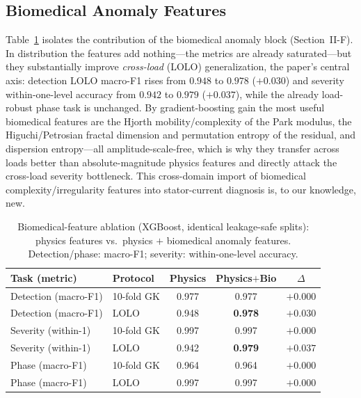 \documentclass[journal]{IEEEtran}
\begin{document}
\subsection{Biomedical Anomaly Features}
Table~\ref{tab:bioablate} isolates the contribution of the biomedical anomaly block (Section~II-F). In
distribution the features add nothing---the metrics are already saturated---but they substantially
improve \emph{cross-load} (LOLO) generalization, the paper's central axis: detection LOLO macro-F1 rises
from $0.948$ to $0.978$ ($+0.030$) and severity within-one-level accuracy from $0.942$ to $0.979$
($+0.037$), while the already load-robust phase task is unchanged. By gradient-boosting gain the most
useful biomedical features are the Hjorth mobility/complexity of the Park modulus, the
Higuchi/Petrosian fractal dimension and permutation entropy of the residual, and dispersion entropy---all
amplitude-scale-free, which is why they transfer across loads better than absolute-magnitude physics
features and directly attack the cross-load severity bottleneck. This cross-domain import of biomedical
complexity/irregularity features into stator-current diagnosis is, to our knowledge, new.

\begin{table}[!t]
\caption{Biomedical-feature ablation (XGBoost, identical leakage-safe splits): physics features vs.\
physics $+$ biomedical anomaly features. Detection/phase: macro-F1; severity: within-one-level accuracy.}
\label{tab:bioablate}
\centering
\footnotesize
\begin{tabular}{@{}llccc@{}}
\toprule
Task (metric) & Protocol & Physics & Physics$+$Bio & $\Delta$ \\
\midrule
Detection (macro-F1) & 10-fold GK & 0.977 & 0.977 & $+0.000$ \\
Detection (macro-F1) & LOLO       & 0.948 & \textbf{0.978} & $\mathbf{+0.030}$ \\
Severity (within-1)  & 10-fold GK & 0.997 & 0.997 & $+0.000$ \\
Severity (within-1)  & LOLO       & 0.942 & \textbf{0.979} & $\mathbf{+0.037}$ \\
Phase (macro-F1)     & 10-fold GK & 0.964 & 0.964 & $+0.000$ \\
Phase (macro-F1)     & LOLO       & 0.997 & 0.997 & $+0.000$ \\
\bottomrule
\end{tabular}
\end{table}
\end{document}
